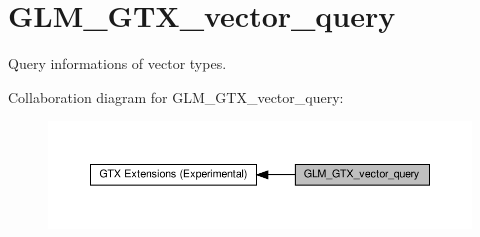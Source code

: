 \hypertarget{group__gtx__vector__query}{}\section{G\+L\+M\+\_\+\+G\+T\+X\+\_\+vector\+\_\+query}
\label{group__gtx__vector__query}


Query informations of vector types.  


Collaboration diagram for G\+L\+M\+\_\+\+G\+T\+X\+\_\+vector\+\_\+query\+:\nopagebreak
\begin{figure}[H]
\begin{center}
\leavevmode
\includegraphics[width=350pt]{group__gtx__vector__query}
\end{center}
\end{figure}
